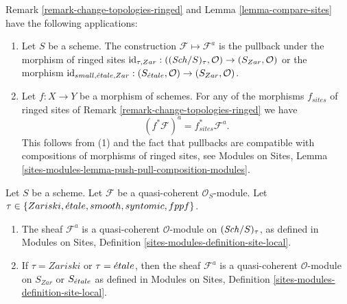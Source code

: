 \begin{remark}
\label{remark-change-topologies-ringed-sites}
Remark \ref{remark-change-topologies-ringed}
and
Lemma \ref{lemma-compare-sites}
have the following applications:
\begin{enumerate}
\item Let $S$ be a scheme.
The construction $\mathcal{F} \mapsto \mathcal{F}^a$ is
the pullback under the morphism of ringed sites
$\text{id}_{\tau, Zar} : ((\mathit{Sch}/S)_\tau, \mathcal{O})
\to (S_{Zar}, \mathcal{O})$
or the morphism
$\text{id}_{small, {\acute{e}tale}, Zar} :
(S_{\acute{e}tale}, \mathcal{O}) \to (S_{Zar}, \mathcal{O})$.
\item Let $f : X \to Y$ be a morphism of schemes.
For any of the morphisms $f_{sites}$ of ringed sites of
Remark \ref{remark-change-topologies-ringed}
we have
$$
(f^*\mathcal{F})^a = f_{sites}^*\mathcal{F}^a.
$$
This follows from (1) and the fact that pullbacks are compatible with
compositions of morphisms of ringed sites, see
Modules on Sites,
Lemma \ref{sites-modules-lemma-push-pull-composition-modules}.
\end{enumerate}
\end{remark}

\begin{lemma}
\label{lemma-quasi-coherent-gives-quasi-coherent}
Let $S$ be a scheme.
Let $\mathcal{F}$ be a quasi-coherent $\mathcal{O}_S$-module.
Let $\tau \in \{Zariski, \linebreak[0] \etale, \linebreak[0]
smooth, \linebreak[0] syntomic, \linebreak[0] fppf\}$.
\begin{enumerate}
\item The sheaf $\mathcal{F}^a$ is a quasi-coherent
$\mathcal{O}$-module on $(\mathit{Sch}/S)_\tau$, as defined in
Modules on Sites, Definition \ref{sites-modules-definition-site-local}.
\item If $\tau = Zariski$ or $\tau = {\acute{e}tale}$, then the sheaf
$\mathcal{F}^a$ is a quasi-coherent $\mathcal{O}$-module on
$S_{Zar}$ or $S_{\acute{e}tale}$ as defined in
Modules on Sites, Definition \ref{sites-modules-definition-site-local}.
\end{enumerate}
\end{lemma}


